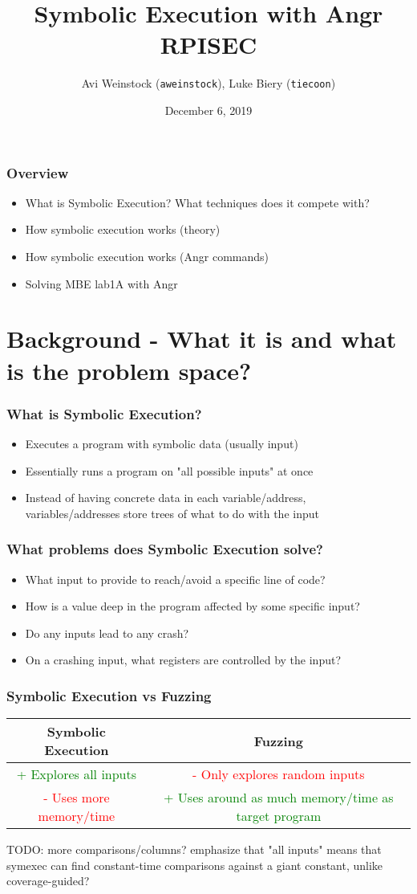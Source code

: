 \documentclass[aspectratio=169]{beamer}
\title{Symbolic Execution with Angr\\RPISEC}
\date{December 6, 2019}
\author{Avi Weinstock (\Verb|aweinstock|), Luke Biery (\Verb|tiecoon|)}
\begin{document}
\maketitle

\begin{frame}[fragile]
\frametitle{Overview}
\begin{itemize}
\item What is Symbolic Execution? What techniques does it compete with?
\item How symbolic execution works (theory)
\item How symbolic execution works (Angr commands)
\item Solving MBE lab1A with Angr
\end{itemize}
\end{frame}

\section{Background - What it is and what is the problem space?}
\begin{frame}[fragile]
\frametitle{What is Symbolic Execution?}
\begin{itemize}
\item Executes a program with symbolic data (usually input)
\item Essentially runs a program on "all possible inputs" at once
\item Instead of having concrete data in each variable/address, \\variables/addresses store trees of what to do with the input
\end{itemize}
\end{frame}

\begin{frame}[fragile]
\frametitle{What problems does Symbolic Execution solve?}
\begin{itemize}
\item What input to provide to reach/avoid a specific line of code?
\item How is a value deep in the program affected by some specific input?
\item Do any inputs lead to any crash?
\item On a crashing input, what registers are controlled by the input?
\end{itemize}
\end{frame}

\begin{frame}[fragile]
\frametitle{Symbolic Execution vs Fuzzing}
\begin{tabular}{c|c}
Symbolic Execution & Fuzzing\\\hline
\textcolor{green}{+ Explores all inputs} & \textcolor{red}{- Only explores random inputs}\\
\textcolor{red}{- Uses more memory/time} & \textcolor{green}{+ Uses around as much memory/time as target program}
\end{tabular}
TODO: more comparisons/columns? emphasize that "all inputs" means that symexec can find constant-time comparisons against a giant constant, unlike coverage-guided?
\end{frame}
\end{document}
